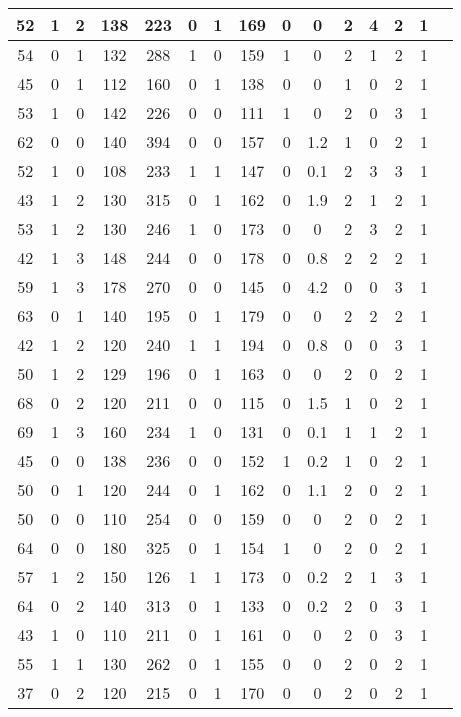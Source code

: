 \documentclass{article}
\begin{document}
\begin{longtable}{
|
c|c|c|c|c|c|c|c|c|c|c|c|c|c|c|}
\hline
52 & 1 & 2 & 138 & 223 & 0 & 1 & 169 & 0 & 0 & 2 & 4 & 2 & 1 \\
\hline
54 & 0 & 1 & 132 & 288 & 1 & 0 & 159 & 1 & 0 & 2 & 1 & 2 & 1 \\
\hline
45 & 0 & 1 & 112 & 160 & 0 & 1 & 138 & 0 & 0 & 1 & 0 & 2 & 1 \\
\hline
53 & 1 & 0 & 142 & 226 & 0 & 0 & 111 & 1 & 0 & 2 & 0 & 3 & 1 \\
\hline
62 & 0 & 0 & 140 & 394 & 0 & 0 & 157 & 0 & 1.2 & 1 & 0 & 2 & 1 \\
\hline
52 & 1 & 0 & 108 & 233 & 1 & 1 & 147 & 0 & 0.1 & 2 & 3 & 3 & 1 \\
\hline
43 & 1 & 2 & 130 & 315 & 0 & 1 & 162 & 0 & 1.9 & 2 & 1 & 2 & 1 \\
\hline
53 & 1 & 2 & 130 & 246 & 1 & 0 & 173 & 0 & 0 & 2 & 3 & 2 & 1 \\
\hline
42 & 1 & 3 & 148 & 244 & 0 & 0 & 178 & 0 & 0.8 & 2 & 2 & 2 & 1 \\
\hline
59 & 1 & 3 & 178 & 270 & 0 & 0 & 145 & 0 & 4.2 & 0 & 0 & 3 & 1 \\
\hline
63 & 0 & 1 & 140 & 195 & 0 & 1 & 179 & 0 & 0 & 2 & 2 & 2 & 1 \\
\hline
42 & 1 & 2 & 120 & 240 & 1 & 1 & 194 & 0 & 0.8 & 0 & 0 & 3 & 1 \\
\hline
50 & 1 & 2 & 129 & 196 & 0 & 1 & 163 & 0 & 0 & 2 & 0 & 2 & 1 \\
\hline
68 & 0 & 2 & 120 & 211 & 0 & 0 & 115 & 0 & 1.5 & 1 & 0 & 2 & 1 \\
\hline
69 & 1 & 3 & 160 & 234 & 1 & 0 & 131 & 0 & 0.1 & 1 & 1 & 2 & 1 \\
\hline
45 & 0 & 0 & 138 & 236 & 0 & 0 & 152 & 1 & 0.2 & 1 & 0 & 2 & 1 \\
\hline
50 & 0 & 1 & 120 & 244 & 0 & 1 & 162 & 0 & 1.1 & 2 & 0 & 2 & 1 \\
\hline
50 & 0 & 0 & 110 & 254 & 0 & 0 & 159 & 0 & 0 & 2 & 0 & 2 & 1 \\
\hline
64 & 0 & 0 & 180 & 325 & 0 & 1 & 154 & 1 & 0 & 2 & 0 & 2 & 1 \\
\hline
57 & 1 & 2 & 150 & 126 & 1 & 1 & 173 & 0 & 0.2 & 2 & 1 & 3 & 1 \\
\hline
64 & 0 & 2 & 140 & 313 & 0 & 1 & 133 & 0 & 0.2 & 2 & 0 & 3 & 1 \\
\hline
43 & 1 & 0 & 110 & 211 & 0 & 1 & 161 & 0 & 0 & 2 & 0 & 3 & 1 \\
\hline
55 & 1 & 1 & 130 & 262 & 0 & 1 & 155 & 0 & 0 & 2 & 0 & 2 & 1 \\
\hline
37 & 0 & 2 & 120 & 215 & 0 & 1 & 170 & 0 & 0 & 2 & 0 & 2 & 1 \\

\end{longtable}
\end{document}
